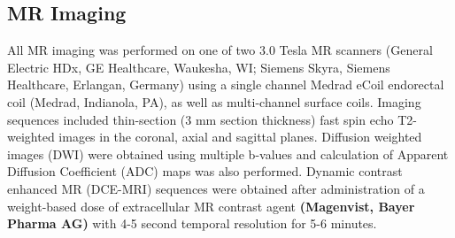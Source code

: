 \subsection{MR Imaging}
All MR imaging was performed on one of two 3.0 Tesla MR scanners (General
Electric HDx, GE Healthcare, Waukesha, WI;  Siemens Skyra, Siemens Healthcare,
Erlangan, Germany) using a single channel Medrad eCoil endorectal coil (Medrad,
Indianola, PA), as well as multi-channel surface coils.  Imaging sequences
included thin-section (3 mm section thickness) fast spin echo T2-weighted
images in the coronal, axial and sagittal planes.  Diffusion weighted images
(DWI) were obtained using multiple b-values and calculation of Apparent
Diffusion Coefficient (ADC) maps was also performed.  Dynamic contrast enhanced
MR (DCE-MRI) sequences were obtained after administration of a weight-based
dose of extracellular MR contrast agent \textbf{(Magenvist\textregistered,
Bayer Pharma AG)} with 4-5 second temporal resolution for 5-6 minutes.
\textbf{}
